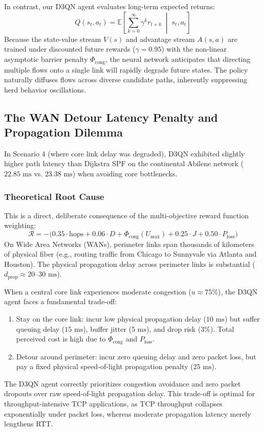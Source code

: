 In contrast, our D3QN agent evaluates long-term expected returns:
\begin{equation}
    Q(s_t, a_t) = \mathbb{E}\left[ \sum_{k=0}^\infty \gamma^k r_{t+k} \;\middle|\; s_t, a_t \right]
\end{equation}
Because the state-value stream $V(s)$ and advantage stream $A(s, a)$ are trained under discounted future rewards ($\gamma = 0.95$) with the non-linear asymptotic barrier penalty $\Phi_{\text{cong}}$, the neural network anticipates that directing multiple flows onto a single link will rapidly degrade future states. The policy naturally diffuses flows across diverse candidate paths, inherently suppressing herd behavior oscillations.

\subsection{The WAN Detour Latency Penalty and Propagation Dilemma}
In Scenario 4 (where core link delay was degraded), D3QN exhibited slightly higher path latency than Dijkstra SPF on the continental Abilene network ($22.85\text{ ms}$ vs. $23.38\text{ ms}$) when avoiding core bottlenecks.

\subsubsection{Theoretical Root Cause}
This is a direct, deliberate consequence of the multi-objective reward function weighting:
\begin{equation}
    \mathcal{R} = - \Big( 0.35 \cdot \text{hops} + 0.06 \cdot D + \Phi_{\text{cong}}(U_{\max}) + 0.25 \cdot J + 0.50 \cdot P_{\text{loss}} \Big)
\end{equation}
On Wide Area Networks (WANs), perimeter links span thousands of kilometers of physical fiber (e.g., routing traffic from Chicago to Sunnyvale via Atlanta and Houston). The physical propagation delay across perimeter links is substantial ($d_{\text{prop}} \approx 20\text{--}30\text{ ms}$).

When a central core link experiences moderate congestion ($u \approx 75\%$), the D3QN agent faces a fundamental trade-off:
\begin{enumerate}
    \item Stay on the core link: incur low physical propagation delay ($10\text{ ms}$) but suffer queuing delay ($15\text{ ms}$), buffer jitter ($5\text{ ms}$), and drop risk ($3\%$). Total perceived cost is high due to $\Phi_{\text{cong}}$ and $P_{\text{loss}}$.
    \item Detour around perimeter: incur zero queuing delay and zero packet loss, but pay a fixed physical speed-of-light propagation penalty ($25\text{ ms}$).
\end{enumerate}
The D3QN agent correctly prioritizes congestion avoidance and zero packet dropouts over raw speed-of-light propagation delay. This trade-off is optimal for throughput-intensive TCP applications, as TCP throughput collapses exponentially under packet loss, whereas moderate propagation latency merely lengthens RTT.

